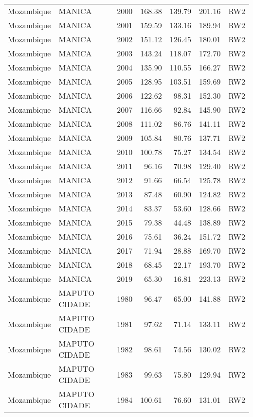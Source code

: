 \begin{longtable}{lllrrrl}
  Mozambique & MANICA & 2000 & 168.38 & 139.79 & 201.16 & RW2 \\ 
  Mozambique & MANICA & 2001 & 159.59 & 133.16 & 189.94 & RW2 \\ 
  Mozambique & MANICA & 2002 & 151.12 & 126.45 & 180.01 & RW2 \\ 
  Mozambique & MANICA & 2003 & 143.24 & 118.07 & 172.70 & RW2 \\ 
  Mozambique & MANICA & 2004 & 135.90 & 110.55 & 166.27 & RW2 \\ 
  Mozambique & MANICA & 2005 & 128.95 & 103.51 & 159.69 & RW2 \\ 
  Mozambique & MANICA & 2006 & 122.62 & 98.31 & 152.30 & RW2 \\ 
  Mozambique & MANICA & 2007 & 116.66 & 92.84 & 145.90 & RW2 \\ 
  Mozambique & MANICA & 2008 & 111.02 & 86.76 & 141.11 & RW2 \\ 
  Mozambique & MANICA & 2009 & 105.84 & 80.76 & 137.71 & RW2 \\ 
  Mozambique & MANICA & 2010 & 100.78 & 75.27 & 134.54 & RW2 \\ 
  Mozambique & MANICA & 2011 & 96.16 & 70.98 & 129.40 & RW2 \\ 
  Mozambique & MANICA & 2012 & 91.66 & 66.54 & 125.78 & RW2 \\ 
  Mozambique & MANICA & 2013 & 87.48 & 60.90 & 124.82 & RW2 \\ 
  Mozambique & MANICA & 2014 & 83.37 & 53.60 & 128.66 & RW2 \\ 
  Mozambique & MANICA & 2015 & 79.38 & 44.48 & 138.89 & RW2 \\ 
  Mozambique & MANICA & 2016 & 75.61 & 36.24 & 151.72 & RW2 \\ 
  Mozambique & MANICA & 2017 & 71.94 & 28.88 & 169.70 & RW2 \\ 
  Mozambique & MANICA & 2018 & 68.45 & 22.17 & 193.70 & RW2 \\ 
  Mozambique & MANICA & 2019 & 65.30 & 16.81 & 223.13 & RW2 \\ 
  Mozambique & MAPUTO CIDADE & 1980 & 96.47 & 65.00 & 141.88 & RW2 \\ 
  Mozambique & MAPUTO CIDADE & 1981 & 97.62 & 71.14 & 133.11 & RW2 \\ 
  Mozambique & MAPUTO CIDADE & 1982 & 98.61 & 74.56 & 130.02 & RW2 \\ 
  Mozambique & MAPUTO CIDADE & 1983 & 99.63 & 75.80 & 129.94 & RW2 \\ 
  Mozambique & MAPUTO CIDADE & 1984 & 100.61 & 76.60 & 131.01 & RW2 \\ 

\end{longtable}
